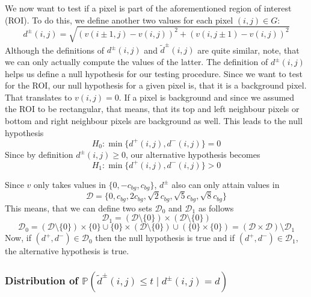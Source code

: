 \documentclass[a4paper,12pt]{article}
\theoremstyle{plain}
\theoremstyle{definition}
\theoremstyle{remark}
\begin{document}
We now want to test if a pixel is part of the aforementioned region of interest (ROI). To do this, we define another two values for each pixel $(i, j) \in G$:
\begin{equation}\label{d}
	d^\pm(i, j) = \sqrt{(v(i \pm 1, j) - v(i, j))^2 + (v(i, j \pm 1) - v(i, j))^2}
\end{equation}
Although the definitions of $d^\pm(i, j)$ and $\tilde{d}^\pm(i, j)$ are quite similar, note, that we can only actually compute the values of the latter. The definition of $d^\pm(i, j)$ helps us define a null hypothesis for our testing procedure. Since we want to test for the ROI, our null hypothesis for a given pixel is, that it is a background pixel. That translates to $v(i, j) = 0$. If a pixel is background and since we assumed the ROI to be rectangular, that means, that its top and left neighbour pixels or bottom and right neighbour pixels are background as well. This leads to the null hypothesis
\begin{equation}
	H_0 : \min\{ d^+(i, j), d^-(i, j) \} = 0
\end{equation}
Since by definition $d^\pm(i, j) \geq 0$, our alternative hypothesis becomes
\begin{equation}
	H_1 : \min\{ d^+(i, j), d^-(i, j) \} > 0
\end{equation}

Since $v$ only takes values in $\{ 0, -c_{bg}, c_{bg} \}$, $d^\pm$ also can only attain values in
\begin{equation*}
	\mathcal{D} = \{ 0, c_{bg}, 2 c_{bg}, \sqrt{2} c_{bg}, \sqrt{5} c_{bg}, \sqrt{8} c_{bg} \}
\end{equation*}
This means, that we can define two sets $\mathcal{D}_0$ and $\mathcal{D}_1$ as follows
\begin{equation*}
	\mathcal{D}_1 = ( \mathcal{D} \setminus \{ 0 \} ) \times ( \mathcal{D} \setminus \{ 0 \} )
\end{equation*}
\begin{equation*}
	\mathcal{D}_0 = ( \mathcal{D} \setminus \{ 0 \} ) \times \{ 0 \} \cup \{ 0 \} \times ( \mathcal{D} \setminus \{ 0 \} ) \cup ( \{ 0 \} \times \{ 0 \} ) = ( \mathcal{D} \times \mathcal{D} ) \setminus \mathcal{D}_1
\end{equation*}
Now, if $(d^+, d^-) \in \mathcal{D}_0$ then the null hypothesis is true and if $(d^+, d^-) \in \mathcal{D}_1$, the alternative hypothesis is true.

\subsubsection{Distribution of $\mathbb{P}(\tilde{d}^\pm(i, j) \leq t \mid d^\pm(i, j) = d)$}
\end{document}
